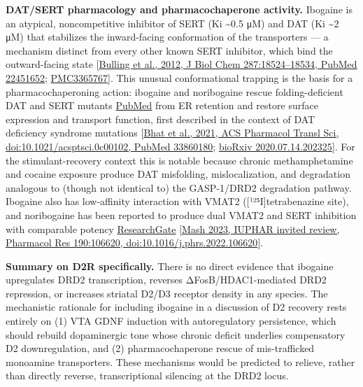 \textbf{DAT/SERT pharmacology and pharmacochaperone activity.} Ibogaine is an atypical, noncompetitive inhibitor of SERT (Ki \textasciitilde0.5 μM) and DAT (Ki \textasciitilde2 μM) that stabilizes the inward-facing conformation of the transporters --- a mechanism distinct from every other known SERT inhibitor, which bind the outward-facing state {[}\href{https://pubmed.ncbi.nlm.nih.gov/22451652/}{Bulling et al., 2012, J Biol Chem 287:18524--18534, PubMed 22451652}; \href{https://pmc.ncbi.nlm.nih.gov/articles/PMC3365767/}{PMC3365767}{]}. This unusual conformational trapping is the basis for a pharmacochaperoning action: ibogaine and noribogaine rescue folding-deficient DAT and SERT mutants \href{https://pubmed.ncbi.nlm.nih.gov/33860180/}{PubMed} from ER retention and restore surface expression and transport function, first described in the context of DAT deficiency syndrome mutations {[}\href{https://pubmed.ncbi.nlm.nih.gov/33860180/}{Bhat et al., 2021, ACS Pharmacol Transl Sci, doi:10.1021/acsptsci.0c00102, PubMed 33860180}; \href{https://www.biorxiv.org/content/10.1101/2020.07.14.202325v1.full}{bioRxiv 2020.07.14.202325}{]}. For the stimulant-recovery context this is notable because chronic methamphetamine and cocaine exposure produce DAT misfolding, mislocalization, and degradation analogous to (though not identical to) the GASP-1/DRD2 degradation pathway. Ibogaine also has low-affinity interaction with VMAT2 ({[}¹²⁵I{]}tetrabenazine site), and noribogaine has been reported to produce dual VMAT2 and SERT inhibition with comparable potency \href{https://www.researchgate.net/publication/369174923_IUPHAR_-_invited_review_-_Ibogaine_-_A_legacy_within_the_current_renaissance_of_psychedelic_therapy}{ResearchGate} {[}\href{https://pubmed.ncbi.nlm.nih.gov/36907284/}{Mash 2023, IUPHAR invited review, Pharmacol Res 190:106620, doi:10.1016/j.phrs.2022.106620}{]}.

\textbf{Summary on D2R specifically.} There is no direct evidence that ibogaine upregulates DRD2 transcription, reverses ΔFosB/HDAC1-mediated DRD2 repression, or increases striatal D2/D3 receptor density in any species. The mechanistic rationale for including ibogaine in a discussion of D2 recovery rests entirely on (1) VTA GDNF induction with autoregulatory persistence, which should rebuild dopaminergic tone whose chronic deficit underlies compensatory D2 downregulation, and (2) pharmacochaperone rescue of mis-trafficked monoamine transporters. These mechanisms would be predicted to relieve, rather than directly reverse, transcriptional silencing at the DRD2 locus.

